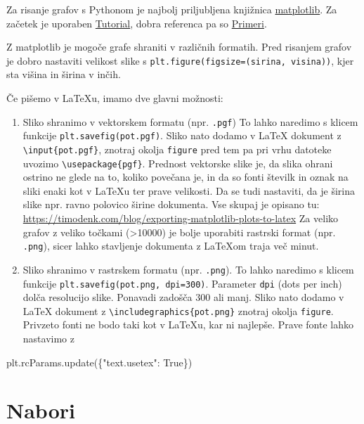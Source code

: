 \documentclass[
]{report}
\newenvironment{Shaded}{\begin{snugshade}}{\end{snugshade}}
\newcommand{\NormalTok}[1]{#1}
\newcommand{\StringTok}[1]{\textcolor[rgb]{0.31,0.60,0.02}{#1}}
\newcommand{\VariableTok}[1]{\textcolor[rgb]{0.00,0.00,0.00}{#1}}
\providecommand{\tightlist}{%
  \setlength{\itemsep}{0pt}\setlength{\parskip}{0pt}}
\begin{document}
Za risanje grafov s Pythonom je najbolj priljubljena knjižnica \href{http://matplotlib.org/}{matplotlib}. Za začetek je uporaben \href{https://matplotlib.org/stable/tutorials/index.html}{Tutorial}, dobra referenca pa so \href{https://matplotlib.org/stable/gallery/index.html}{Primeri}.

Z matplotlib je mogoče grafe shraniti v različnih formatih. Pred risanjem grafov je dobro nastaviti velikost slike s \texttt{plt.figure(figsize=(sirina,\ visina))}, kjer sta višina in širina v inčih.

Če pišemo v LaTeXu, imamo dve glavni možnosti:

\begin{enumerate}
\def\labelenumi{\arabic{enumi}.}
\tightlist
\item
  Sliko shranimo v vektorskem formatu (npr. \texttt{.pgf}) To lahko naredimo s klicem funkcije \texttt{plt.savefig(pot.pgf)}. Sliko nato dodamo v LaTeX dokument z \texttt{\textbackslash{}input\{pot.pgf\}}, znotraj okolja \texttt{figure} pred tem pa pri vrhu datoteke uvozimo \texttt{\textbackslash{}usepackage\{pgf\}}. Prednost vektorske slike je, da slika ohrani ostrino ne glede na to, koliko povečana je, in da so fonti številk in oznak na sliki enaki kot v LaTeXu ter prave velikosti. Da se tudi nastaviti, da je širina slike npr. ravno polovico širine dokumenta. Vse skupaj je opisano tu: \url{https://timodenk.com/blog/exporting-matplotlib-plots-to-latex} Za veliko grafov z veliko točkami (\textgreater10000) je bolje uporabiti rastrski format (npr. \texttt{.png}), sicer lahko stavljenje dokumenta z LaTeXom traja več minut.
\item
  Sliko shranimo v rastrskem formatu (npr. \texttt{.png}). To lahko naredimo s klicem funkcije \texttt{plt.savefig(pot.png,\ dpi=300)}. Parameter \texttt{dpi} (dots per inch) dolča resolucijo slike. Ponavadi zadošča 300 ali manj. Sliko nato dodamo v LaTeX dokument z \texttt{\textbackslash{}includegraphics\{pot.png\}} znotraj okolja \texttt{figure}. Privzeto fonti ne bodo taki kot v LaTeXu, kar ni najlepše. Prave fonte lahko nastavimo z
\end{enumerate}

\begin{Shaded}
\begin{Highlighting}[]
\NormalTok{plt.rcParams.update(\{}\StringTok{"text.usetex"}\NormalTok{: }\VariableTok{True}\NormalTok{\})}
\end{Highlighting}
\end{Shaded}

\hypertarget{nabori}{%
\section{Nabori}\label{nabori}}
\end{document}
